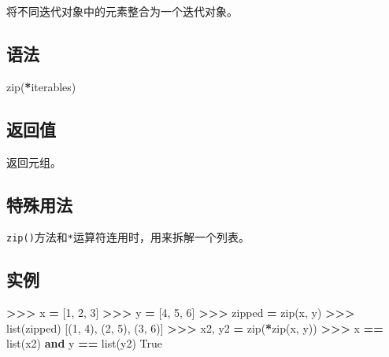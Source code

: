 \documentclass[]{ctexbook}
\newenvironment{Shaded}{\begin{snugshade}}{\end{snugshade}}
\newcommand{\BuiltInTok}[1]{#1}
\newcommand{\DecValTok}[1]{\textcolor[rgb]{0.00,0.00,0.81}{#1}}
\newcommand{\KeywordTok}[1]{\textcolor[rgb]{0.13,0.29,0.53}{\textbf{#1}}}
\newcommand{\NormalTok}[1]{#1}
\newcommand{\OperatorTok}[1]{\textcolor[rgb]{0.81,0.36,0.00}{\textbf{#1}}}
\newcommand{\VariableTok}[1]{\textcolor[rgb]{0.00,0.00,0.00}{#1}}
\begin{document}
将不同迭代对象中的元素整合为一个迭代对象。

\hypertarget{ux8bedux6cd5-1}{%
\subsection{语法}\label{ux8bedux6cd5-1}}

\begin{Shaded}
\begin{Highlighting}[]
\BuiltInTok{zip}\NormalTok{(}\OperatorTok{*}\NormalTok{iterables)}
\end{Highlighting}
\end{Shaded}

\hypertarget{ux8fd4ux56deux503c-1}{%
\subsection{返回值}\label{ux8fd4ux56deux503c-1}}

返回元组。

\hypertarget{ux7279ux6b8aux7528ux6cd5}{%
\subsection{特殊用法}\label{ux7279ux6b8aux7528ux6cd5}}

\texttt{zip()}方法和\texttt{*}运算符连用时，用来拆解一个列表。

\hypertarget{ux5b9eux4f8b-1}{%
\subsection{实例}\label{ux5b9eux4f8b-1}}

\begin{Shaded}
\begin{Highlighting}[]
\OperatorTok{>>>}\NormalTok{ x }\OperatorTok{=}\NormalTok{ [}\DecValTok{1}\NormalTok{, }\DecValTok{2}\NormalTok{, }\DecValTok{3}\NormalTok{]}
\OperatorTok{>>>}\NormalTok{ y }\OperatorTok{=}\NormalTok{ [}\DecValTok{4}\NormalTok{, }\DecValTok{5}\NormalTok{, }\DecValTok{6}\NormalTok{]}
\OperatorTok{>>>}\NormalTok{ zipped }\OperatorTok{=} \BuiltInTok{zip}\NormalTok{(x, y)}
\OperatorTok{>>>} \BuiltInTok{list}\NormalTok{(zipped)}
\NormalTok{[(}\DecValTok{1}\NormalTok{, }\DecValTok{4}\NormalTok{), (}\DecValTok{2}\NormalTok{, }\DecValTok{5}\NormalTok{), (}\DecValTok{3}\NormalTok{, }\DecValTok{6}\NormalTok{)]}
\OperatorTok{>>>}\NormalTok{ x2, y2 }\OperatorTok{=} \BuiltInTok{zip}\NormalTok{(}\OperatorTok{*}\BuiltInTok{zip}\NormalTok{(x, y))}
\OperatorTok{>>>}\NormalTok{ x }\OperatorTok{==} \BuiltInTok{list}\NormalTok{(x2) }\KeywordTok{and}\NormalTok{ y }\OperatorTok{==} \BuiltInTok{list}\NormalTok{(y2)}
\VariableTok{True}
\end{Highlighting}
\end{Shaded}
\end{document}

